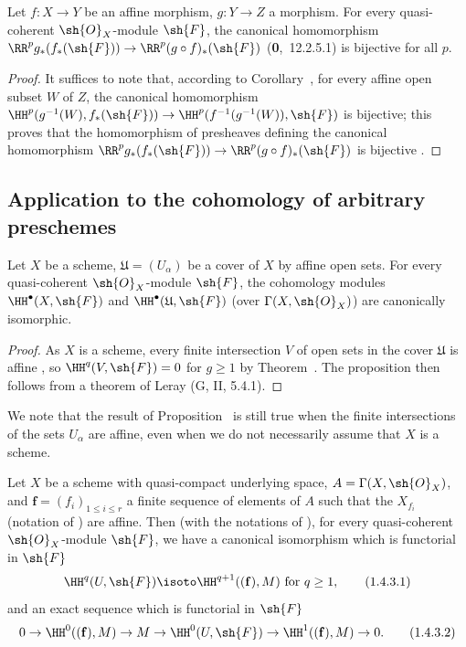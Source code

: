 \begin{corollary}[1.3.4]
\label{III.1.3.4}
Let $f:X\to Y$ be an affine morphism, $g:Y\to Z$ a morphism.
For every quasi-coherent $\sh{O}_X$-module $\sh{F}$, the canonical homomorphism $\RR^p g_*(f_*(\sh{F}))\to\RR^p(g\circ f)_*(\sh{F})$ (\textbf{0},~12.2.5.1) is bijective for all $p$.
\end{corollary}

\begin{proof}
It suffices to note that, according to Corollary~, for every affine open subset $W$ of $Z$, the canonical homomorphism $\HH^p(g^{-1}(W),f_*(\sh{F}))\to\HH^p(f^{-1}(g^{-1}(W)),\sh{F})$ is bijective; this proves that the homomorphism of presheaves defining the canonical homomorphism $\RR^p g_*(f_*(\sh{F}))\to\RR^p(g\circ f)_*(\sh{F})$ is bijective .
\end{proof}

\subsection{Application to the cohomology of arbitrary preschemes}
\label{subsection:III.1.4}

\begin{proposition}[1.4.1]
\label{III.1.4.1}
Let $X$ be a scheme, $\mathfrak{U}=(U_\alpha)$ be a cover of $X$ by affine open sets.
For every quasi-coherent $\sh{O}_X$-module $\sh{F}$, the cohomology modules $\HH^\bullet(X,\sh{F})$ and $\HH^\bullet(\mathfrak{U},\sh{F})$ (over $\Gamma(X,\sh{O}_X)$) are canonically isomorphic.
\end{proposition}

\begin{proof}
As $X$ is a scheme, every finite intersection $V$ of open sets in the cover $\mathfrak{U}$ is affine , so $\HH^q(V,\sh{F})=0$ for $g\geq 1$ by Theorem~.
The proposition then follows from a theorem of Leray (G, II, 5.4.1).
\end{proof}

\begin{remark}[1.4.2]
\label{III.1.4.2}
We note that the result of Proposition~ is still true when the finite intersections of the sets $U_\alpha$ are affine, even when we do not necessarily assume that $X$ is a scheme.
\end{remark}

\begin{corollary}[1.4.3]
\label{III.1.4.3}
Let $X$ be a scheme with quasi-compact underlying space, $A=\Gamma(X,\sh{O}_X)$, and $\mathbf{f}=(f_i)_{1\leq i\leq r}$ a finite sequence of elements of $A$ such that the $X_{f_i}$ (notation of ) are affine.
Then (with the notations of ), for every quasi-coherent $\sh{O}_X$-module $\sh{F}$, we have a canonical isomorphism which is functorial in $\sh{F}$
\[
  \HH^q(U,\sh{F})\isoto\HH^{q+1}((\mathbf{f}),M)\text{ for }q\geq 1,
  \tag{1.4.3.1}\label{III.1.4.3.1}
\]
and an exact sequence which is functorial in $\sh{F}$
\[
  0\to\HH^0((\mathbf{f}),M)\to M\to\HH^0(U,\sh{F})\to\HH^1((\mathbf{f}),M)\to 0.
  \tag{1.4.3.2}
\]
\end{corollary}

